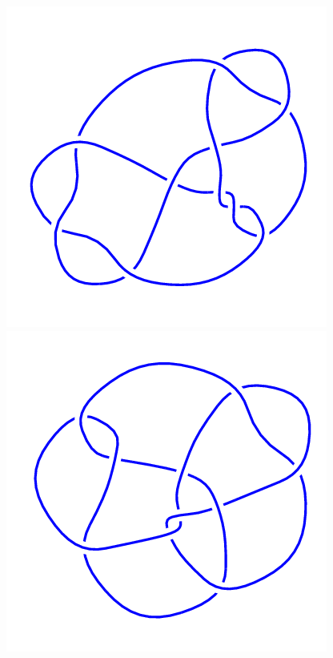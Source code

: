 \begin{figure}[H]
\begin{minipage}[b]{.18\linewidth}
	\end{minipage}
	\begin{minipage}[b]{.18\linewidth}
		\centering
		\includegraphics[width=\linewidth]{../data/10_144.png}
	\end{minipage}
	\begin{minipage}[b]{.18\linewidth}
		\centering
		\includegraphics[width=\linewidth]{../data/10_145.png}

\end{minipage}
\end{figure}
